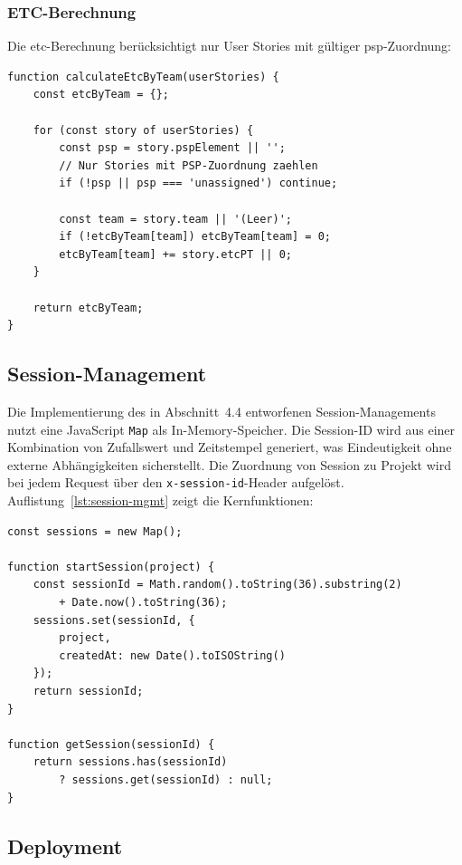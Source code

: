 \subsubsection{ETC-Berechnung}

Die \gls{etc}-Berechnung berücksichtigt nur User Stories mit gültiger \gls{psp}-Zuordnung:

\begin{lstlisting}[caption={ETC-Berechnung}, label={lst:etc-calc}]
function calculateEtcByTeam(userStories) {
    const etcByTeam = {};

    for (const story of userStories) {
        const psp = story.pspElement || '';
        // Nur Stories mit PSP-Zuordnung zaehlen
        if (!psp || psp === 'unassigned') continue;

        const team = story.team || '(Leer)';
        if (!etcByTeam[team]) etcByTeam[team] = 0;
        etcByTeam[team] += story.etcPT || 0;
    }

    return etcByTeam;
}
\end{lstlisting}

\subsection{Session-Management}

Die Implementierung des in Abschnitt~4.4 entworfenen Session-Managements nutzt eine JavaScript \texttt{Map} als In-Memory-Speicher. Die Session-ID wird aus einer Kombination von Zufallswert und Zeitstempel generiert, was Eindeutigkeit ohne externe Abhängigkeiten sicherstellt. Die Zuordnung von Session zu Projekt wird bei jedem Request über den \texttt{x-session-id}-Header aufgelöst. Auflistung~\ref{lst:session-mgmt} zeigt die Kernfunktionen:

\begin{lstlisting}[caption={Session-Verwaltung}, label={lst:session-mgmt}]
const sessions = new Map();

function startSession(project) {
    const sessionId = Math.random().toString(36).substring(2)
        + Date.now().toString(36);
    sessions.set(sessionId, {
        project,
        createdAt: new Date().toISOString()
    });
    return sessionId;
}

function getSession(sessionId) {
    return sessions.has(sessionId)
        ? sessions.get(sessionId) : null;
}
\end{lstlisting}

\subsection{Deployment}


